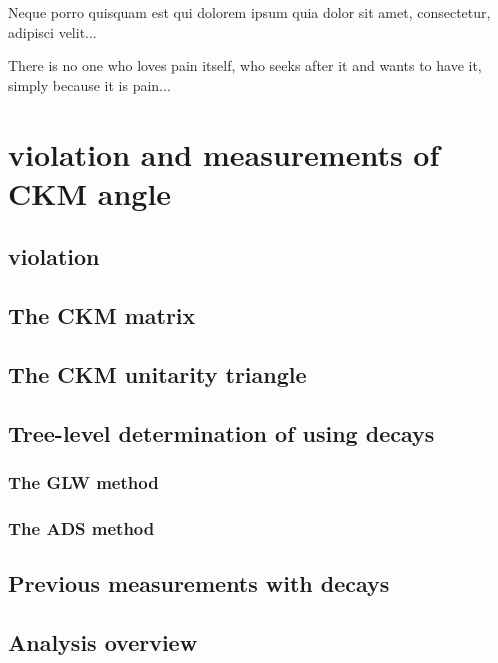 \begin{savequote}[8cm]
\textlatin{Neque porro quisquam est qui dolorem ipsum quia dolor sit amet, consectetur, adipisci velit...}

There is no one who loves pain itself, who seeks after it and wants to have it, simply because it is pain...
\end{savequote}

\chapter{\label{ch:2-background}\CP violation and measurements of CKM angle \Pgamma} 

\minitoc

\section{\CP violation}

\section{The CKM matrix}

\section{The CKM unitarity triangle}

\section{Tree-level determination of \Pgamma using \decay{\Bpm}{\D\Kstarpm} decays}

\subsection{The GLW method}

\subsection{The ADS method}

\section{Previous \Pgamma measurements with \decay{\Bpm}{\D\Kstarpm} decays}

\section{Analysis overview}

